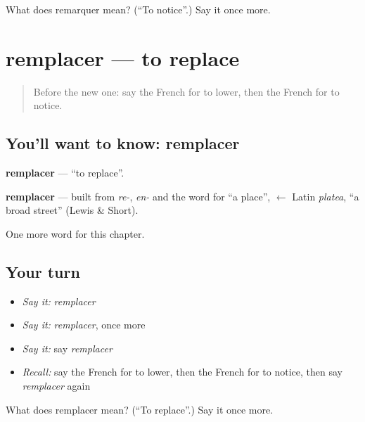 \begin{tcolorbox}[breakable,colback=teal!4,colframe=teal!35!black,title={Before you move on}]
What does remarquer mean? (\textquotedblleft{}To notice\textquotedblright{}.) Say it once more.
\end{tcolorbox}
\section[remplacer]{remplacer — to replace}

\label{lesson:FR-C153-remplacer}



\begin{quote}
Before the new one: say the French for to lower, then the French for to notice.
\end{quote}

\subsection*{You'll want to know: remplacer}
\textbf{remplacer} — \textquotedblleft{}to replace\textquotedblright{}.

\begin{cousinweb}
\textbf{remplacer} — built from \emph{re-}, \emph{en-} and the word for \textquotedblleft{}a place\textquotedblright{}, $\leftarrow$ Latin \emph{platea}, \textquotedblleft{}a broad street\textquotedblright{} (Lewis \& Short).
\end{cousinweb}

\begin{grammarlens}[title={What you've built}]
One more word for this chapter.
\end{grammarlens}

\subsection*{Your turn}
\begin{itemize}
\raggedright
  \item \emph{Say it:} \emph{remplacer}
  \item \emph{Say it:} \emph{remplacer}, once more
  \item \emph{Say it:} say \emph{remplacer}
  \item \emph{Recall:} say the French for to lower, then the French for to notice, then say \emph{remplacer} again
\end{itemize}

\begin{tcolorbox}[breakable,colback=teal!4,colframe=teal!35!black,title={Before you move on}]
What does remplacer mean? (\textquotedblleft{}To replace\textquotedblright{}.) Say it once more.
\end{tcolorbox}
